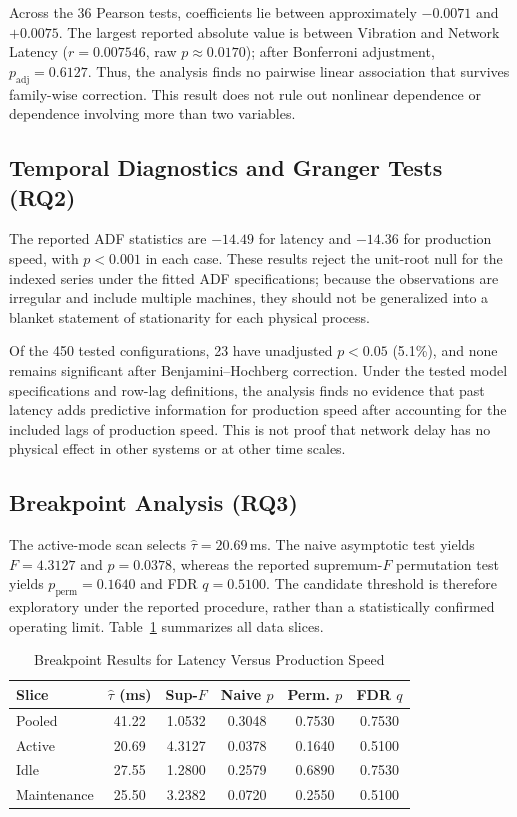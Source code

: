 \documentclass[conference]{IEEEtran}
\begin{document}
Across the 36 Pearson tests, coefficients lie between approximately $-0.0071$ and $+0.0075$. The largest reported absolute value is between Vibration and Network Latency ($r = 0.007546$, raw $p \approx 0.0170$); after Bonferroni adjustment, $p_{\text{adj}} = 0.6127$. Thus, the analysis finds no pairwise linear association that survives family-wise correction. This result does not rule out nonlinear dependence or dependence involving more than two variables.

\subsection{Temporal Diagnostics and Granger Tests (RQ2)}
The reported ADF statistics are $-14.49$ for latency and $-14.36$ for production speed, with $p < 0.001$ in each case. These results reject the unit-root null for the indexed series under the fitted ADF specifications; because the observations are irregular and include multiple machines, they should not be generalized into a blanket statement of stationarity for each physical process.

Of the 450 tested configurations, 23 have unadjusted $p < 0.05$ (5.1\%), and none remains significant after Benjamini--Hochberg correction. Under the tested model specifications and row-lag definitions, the analysis finds no evidence that past latency adds predictive information for production speed after accounting for the included lags of production speed. This is not proof that network delay has no physical effect in other systems or at other time scales.

\subsection{Breakpoint Analysis (RQ3)}
The active-mode scan selects $\hat{\tau} = 20.69$\,ms. The naive asymptotic test yields $F = 4.3127$ and $p = 0.0378$, whereas the reported supremum-$F$ permutation test yields $p_{\text{perm}} = 0.1640$ and FDR $q = 0.5100$. The candidate threshold is therefore exploratory under the reported procedure, rather than a statistically confirmed operating limit. Table~\ref{tab:breakpoint_results} summarizes all data slices.

\begin{table}[t]
\caption{Breakpoint Results for Latency Versus Production Speed}
\label{tab:breakpoint_results}
\centering
\footnotesize
\setlength{\tabcolsep}{3pt}
\begin{tabular}{@{}lccccc@{}}
\toprule
\textbf{Slice} & $\hat{\tau}$ \textbf{(ms)} & \textbf{Sup-$F$} & \textbf{Naive $p$} & \textbf{Perm. $p$} & \textbf{FDR $q$} \\
\midrule
Pooled & 41.22 & 1.0532 & 0.3048 & 0.7530 & 0.7530 \\
Active & 20.69 & 4.3127 & 0.0378 & 0.1640 & 0.5100 \\
Idle & 27.55 & 1.2800 & 0.2579 & 0.6890 & 0.7530 \\
Maintenance & 25.50 & 3.2382 & 0.0720 & 0.2550 & 0.5100 \\
\bottomrule
\end{tabular}
\end{table}
\end{document}
